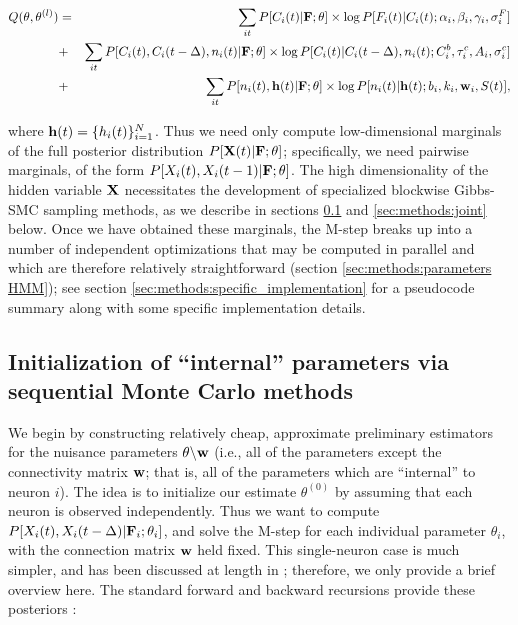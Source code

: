 \begin{eqnarray}
  Q(\bth,\bth^{(l)}) &=& \sum_{it} P[C_i(t) | \bF; \bth] \times \log
P[F_i(t)|C_i(t); \alpha_i, \beta_i, \gamma_i, \sigma^F_i] \nonumber \\
&+& \sum_{it} P[C_i(t), C_i(t-\Delta), n_i(t) | \bF; \bth] \times \log
P[C_i(t)|C_i(t-\Delta), n_i(t); C^b_i, \tau^c_i, A_i, \sigma^c_i]
\nonumber \\ &+& \sum_{it} P[n_i(t), \bh(t) | \bF; \bth] \times \log
P[n_i(t)| \bh(t); b_i, k_i, \bw_i, S(t)],
\label{eqn:loglik:definition-expl}
\end{eqnarray}

where $\mathbf{h}(t)=\{h_i(t)\}_{i=1}^N$. Thus we need only compute low-dimensional marginals of the full posterior distribution $P[{\bf X}(t) | {\bf F}; \mathbf{\theta}]$; specifically, we need pairwise marginals, of the form $P[X_i(t), X_i(t-1) | {\bf F}; \mathbf{\theta}]$. The high dimensionality of the hidden variable ${\bf X}$ necessitates the development of specialized blockwise Gibbs-SMC sampling methods, as we describe in sections \ref{sec:methods:indep} and \ref{sec:methods:joint} below. Once we have obtained these marginals, the M-step breaks up into a number of independent optimizations that may be computed in parallel and which are therefore relatively straightforward (section \ref{sec:methods:parameters HMM}); see section \ref{sec:methods:specific_implementation} for a pseudocode summary along with some specific implementation details.

\subsection{Initialization of ``internal'' parameters via sequential Monte Carlo methods} \label{sec:methods:indep}

We begin by constructing relatively cheap, approximate preliminary estimators for the nuisance parameters $\theta \backslash \mathbf{w}$ (i.e., all of the parameters except the connectivity matrix $\mathbf{w}$; that is, all of the parameters which are ``internal'' to neuron $i$). The idea is to initialize our estimate $\theta^{(0)}$ by assuming that each neuron is observed independently. Thus we want to compute $P[X_i(t), X_i(t-\Delta) | {\bf F}_i; \mathbf{\theta}_i]$, and solve the M-step for each individual parameter $\theta_i$, with the connection matrix $\mathbf{w}$ held fixed. This single-neuron case is much simpler, and has been discussed at length in \cite{Vogelstein2009}; therefore, we only provide a brief overview here. The standard forward and backward recursions provide these posteriors \cite{ShumwayStoffer06}:

